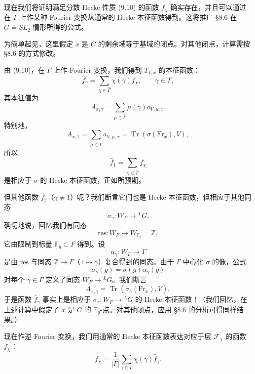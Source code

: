 \documentclass[11pt,a4paper]{article}
\newcommand{\Tr}{\operatorname{Tr}}
\begin{document}
现在我们将证明满足分数 Hecke 性质 (9.10) 的函数 $f_\chi$ 确实存在，并且可以通过在 $\Gamma$ 上作某种 Fourier 变换从通常的 Hecke 本征函数得到。这将推广 §8.6 在 $G=SL_2$ 情形所得的公式。


为简单起见，这里假定 $x$ 是 $C$ 的剩余域等于基域的闭点。对其他闭点，计算需按 §8.6 的方式修改。

由 (9.10)，在 $\Gamma$ 上作 Fourier 变换，我们得到 $T_{V,x}$ 的本征函数：
\begin{equation}\tag{9.13}
\widehat{f}_\gamma = \sum_{\chi\in\widehat{\Gamma}}\chi(\gamma)f_\chi,
\qquad \gamma\in\Gamma,
\end{equation}
其本征值为
\begin{equation}\tag{9.14}
A_{x,\gamma} = \sum_{\mu\in\widehat{\Gamma}}\mu(\gamma)a_{V,\mu,x}.
\end{equation}
特别地，
\[
A_{x,1} = \sum_{\mu\in\widehat{\Gamma}}a_{V,\mu,x} = \Tr(\sigma(\mathrm{Fr}_x),V),
\]
所以
\[
\widehat{f}_1 = \sum_{\chi\in\widehat{\Gamma}}f_\chi
\]
是相应于 $\sigma$ 的 Hecke 本征函数，正如所预期。

但其他函数 $\widehat{f}_\gamma$（$\gamma\neq 1$）呢？我们断言它们也是 Hecke 本征函数，但相应于其他同态
\[
\sigma_\gamma: W_F\to{}^{L}G.
\]
确切地说，回忆我们有同态
\[
\mathrm{res}: W_F\to W_{\mathbb{F}_q}=\mathbb{Z},
\]
它由限制到标量 $\mathbb{F}_q\subset F$ 得到。设
\[
\alpha_\gamma: W_F\to\Gamma
\]
是由 $\mathrm{res}$ 与同态 $\mathbb{Z}\to\Gamma$（$1\mapsto\gamma$）复合得到的同态。由于 $\Gamma$ 中心化 $\sigma$ 的像，公式
\[
\sigma_\gamma(g) = \sigma(g)\alpha_\gamma(g)
\]
对每个 $\gamma\in\Gamma$ 定义了同态 $W_F\to{}^{L}G$。我们断言
\[
A_{x,\gamma} = \Tr(\sigma_\gamma(\mathrm{Fr}_x),V),
\]
于是函数 $\widehat{f}_\gamma$ 事实上是相应于 $\sigma_\gamma: W_F\to{}^{L}G$ 的 Hecke 本征函数！（我们回忆，在上述计算中假定了 $x$ 是 $C$ 的 $\mathbb{F}_q$-点。对其他闭点，应用 §8.6 的分析可得同样结果。）

现在作逆 Fourier 变换，我们用通常的 Hecke 本征函数表达对应于层 $\mathcal{F}_\chi$ 的函数 $f_\chi$：
\begin{equation}\tag{9.15}
f_\chi = \frac{1}{|\Gamma|}\sum_{\gamma\in\Gamma}\chi(\gamma)\widehat{f}_\gamma.
\end{equation}
\end{document}
